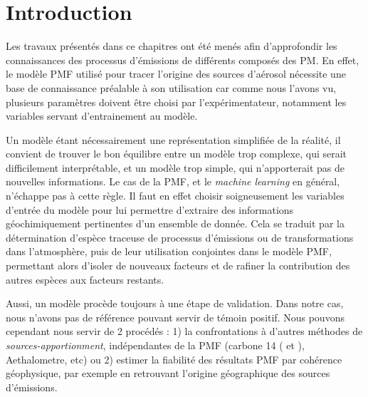 \section*{Introduction}%
\label{sec:introduction}


Les travaux présentés dans ce chapitres ont été menés afin d'approfondir les connaissances
des processus d'émissions de différents composés des PM. En effet, le modèle PMF utilisé
pour tracer l'origine des sources d'aérosol nécessite une base de connaissance préalable à
son utilisation car comme nous l'avons vu, plusieurs paramètres doivent être choisi par
l'expérimentateur, notamment les variables servant d'entrainement au modèle.

Un modèle étant nécessairement une représentation simplifiée de la réalité, il convient de
trouver le bon équilibre entre un modèle trop complexe, qui serait difficilement
interprétable, et un modèle trop simple, qui n'apporterait pas de nouvelles informations.
Le cas de la PMF, et le \textit{machine learning} en général, n'échappe pas à cette règle.
Il faut en effet choisir soigneusement les variables d'entrée du modèle pour lui permettre
d'extraire des informations géochimiquement pertinentes d'un ensemble de donnée. Cela se
traduit par la détermination d'espèce traceuse de processus d'émissions ou de
transformations dans l'atmosphère, puis de leur utilisation conjointes dans le modèle PMF,
permettant alors d'isoler de nouveaux facteurs et de rafiner la contribution des autres
espèces aux facteurs restants.

Aussi, un modèle procède toujours à une étape de validation. Dans notre cas, nous n'avons
pas de référence pouvant servir de témoin positif. Nous pouvons cependant nous servir de 2
procédés : 1) la confrontations à d'autres méthodes de \textit{sources-apportionment},
indépendantes de la PMF (carbone 14 (\textcite{bonvalotEstimating2016} et
\textcite{chevrierChauffage2016}), Aethalometre, etc) ou 2) estimer la fiabilité des
résultats PMF par cohérence géophysique, par exemple en retrouvant l'origine géographique
des sources d'émissions.

